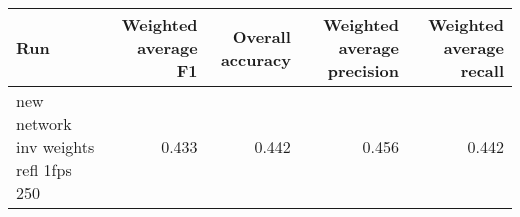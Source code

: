 \begin{tabular}{lrrrr}
\toprule
Run & Weighted average F1 & Overall accuracy & Weighted average precision & Weighted average recall \\
\midrule
new network inv weights refl 1fps 250 & 0.433 & 0.442 & 0.456 & 0.442 \\
\bottomrule
\end{tabular}
